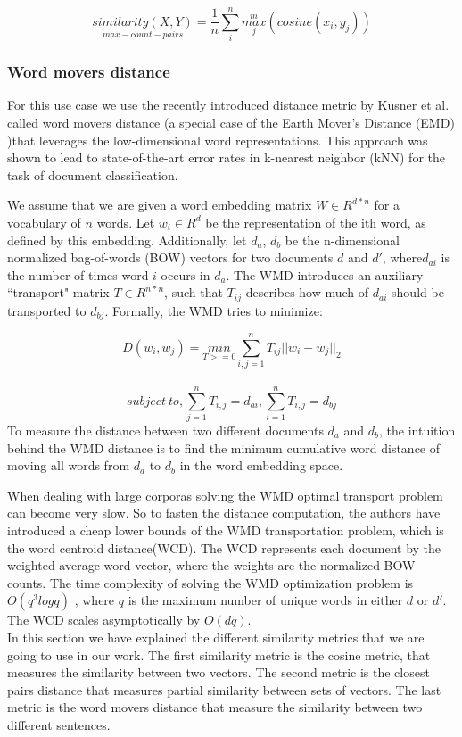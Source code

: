 \documentclass{article}
\begin{document}
$$\underset{max-count-pairs}{similarity(X,Y)}=\frac{1}{n}\sum_{i}^{n} \overset {m}{\underset{j}{max}}( cosine(x_{i},y_{j}))$$
\subsubsection{Word movers distance}

For this use case we use the recently introduced distance metric by  Kusner et al. \cite{wmd:2015} called word movers distance (a special case of the Earth Mover's Distance (EMD) \cite{emd:1998})that leverages the low-dimensional word representations.
This approach was shown to lead to state-of-the-art error rates in k-nearest neighbor (kNN) for the task of document classification.

We assume that we are given a word embedding matrix $W \in R^{d*n}$ for a vocabulary of $n$ words. Let 
$w_{i} \in R^{d} $ be the representation of the ith word, as defined by this embedding. Additionally, let $d_{a}$, $d_{b}$ be the n-dimensional normalized bag-of-words (BOW) vectors for two documents $d$ and $d'$, where$ d_{ai} $ is the number of times word $i$ occurs in $d_{a}$. The WMD introduces an auxiliary ``transport" matrix $T \in R^{n*n}$, such that $T_{ij}$ describes how much of $d_{ai}$ should be transported to $d_{bj}$.
Formally, the WMD tries to minimize:

$$D(w_{i},w_{j})=\underset{T>=0}{ min} \sum_{i,j=1}^{n} T_{ij} || w_{i}-w_{j}||_{2} $$\\
$$subject \ to, \sum_{j=1}^{n} T_{i,j}=d_{ai}, \sum_{i=1}^{n} T_{i,j}=d_{bj}$$
To measure the distance between two different documents $d_{a}$ and $d_{b}$, the intuition behind the WMD distance is to find the minimum cumulative word distance of moving  all words from $d_{a}$ to $d_{b}$ in the word embedding space.

When dealing with large corporas solving the WMD optimal transport problem can become very slow. So to fasten the distance computation, the authors have introduced  a cheap lower bounds of the WMD transportation problem, which is the word centroid distance(WCD). The WCD represents each document by the weighted average word vector, where the weights are the normalized BOW counts.
The time complexity of solving the WMD optimization problem is $O(q^{3}log q)$ \cite{emdcomlexity:2009}, where $q$ is the maximum number of unique words in either $d$ or $d'$. The WCD scales asymptotically by $O(dq)$.
\\
In this section we have explained the different similarity metrics that we are going to use in our work. The first similarity metric is the cosine metric, that measures the similarity between two vectors. The second metric is the closest pairs distance that measures partial similarity between sets of vectors. The last metric is the word movers distance that measure the similarity between two different sentences.
\end{document}
